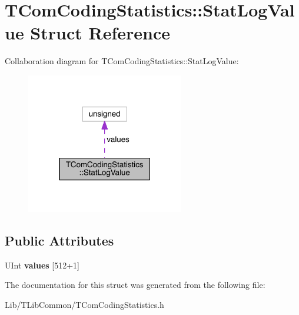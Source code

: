 \hypertarget{struct_t_com_coding_statistics_1_1_stat_log_value}{}\section{T\+Com\+Coding\+Statistics\+:\+:Stat\+Log\+Value Struct Reference}
\label{struct_t_com_coding_statistics_1_1_stat_log_value}


Collaboration diagram for T\+Com\+Coding\+Statistics\+:\+:Stat\+Log\+Value\+:
\nopagebreak
\begin{figure}[H]
\begin{center}
\leavevmode
\includegraphics[width=195pt]{df/dc3/struct_t_com_coding_statistics_1_1_stat_log_value__coll__graph}
\end{center}
\end{figure}
\subsection*{Public Attributes}
\begin{DoxyCompactItemize}
\item 
\mbox{\label{struct_t_com_coding_statistics_1_1_stat_log_value_a2e9a61f06fb37f772edf217d32914c8c}} 
U\+Int {\bfseries values} \mbox{[}512+1\mbox{]}
\end{DoxyCompactItemize}


The documentation for this struct was generated from the following file\+:\begin{DoxyCompactItemize}
\item 
Lib/\+T\+Lib\+Common/T\+Com\+Coding\+Statistics.\+h\end{DoxyCompactItemize}
